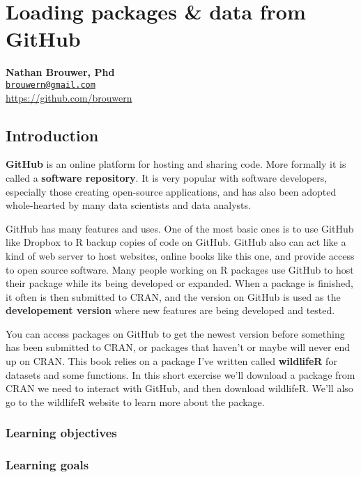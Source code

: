 \documentclass[]{book}
\theoremstyle{definition}
\theoremstyle{definition}
\theoremstyle{definition}
\theoremstyle{remark}
\begin{document}
\chapter{Loading packages \& data from
GitHub}\label{loading-packages-data-from-github}

\textbf{Nathan Brouwer, Phd}\\
\href{mailto:brouwern@gmail.com}{\nolinkurl{brouwern@gmail.com}}\\
\url{https://github.com/brouwern}\\
\citet{lobrowR}

\section{Introduction}\label{introduction-2}

\textbf{GitHub} is an online platform for hosting and sharing code. More
formally it is called a \textbf{software repository}. It is very popular
with software developers, especially those creating open-source
applications, and has also been adopted whole-hearted by many data
scientists and data analysts.

GitHub has many features and uses. One of the most basic ones is to use
GitHub like Dropbox to R backup copies of code on GitHub. GitHub also
can act like a kind of web server to host websites, online books like
this one, and provide access to open source software. Many people
working on R packages use GitHub to host their package while its being
developed or expanded. When a package is finished, it often is then
submitted to CRAN, and the version on GitHub is used as the
\textbf{developement version} where new features are being developed and
tested.

You can access packages on GitHub to get the newest version before
something has been submitted to CRAN, or packages that haven't or maybe
will never end up on CRAN. This book relies on a package I've written
called \textbf{wildlifeR} for datasets and some functions. In this short
exercise we'll download a package from CRAN we need to interact with
GitHub, and then download wildlifeR. We'll also go to the wildlifeR
website to learn more about the package.

\subsection{Learning objectives}\label{learning-objectives-1}

\subsection{Learning goals}\label{learning-goals-1}
\end{document}
